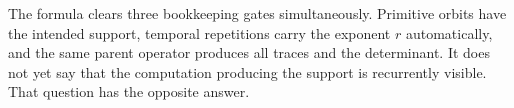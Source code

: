 The formula clears three bookkeeping gates simultaneously.  Primitive
orbits have the intended support, temporal repetitions carry the exponent
$r$ automatically, and the same parent operator produces all traces and the
determinant.  It does not yet say that the computation producing the support
is recurrently visible.  That question has the opposite answer.
